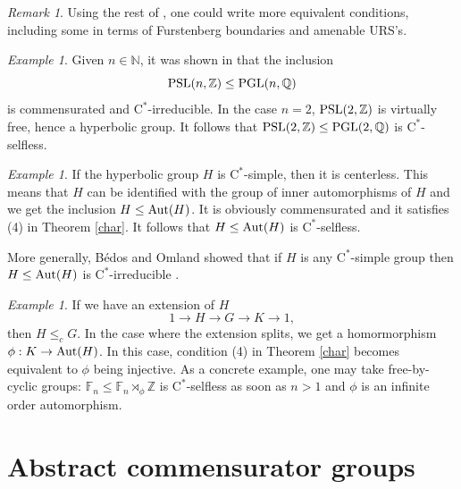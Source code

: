 \documentclass[11pt]{article}
\theoremstyle{definition}
\theoremstyle{remark}
\newtheorem{rem}[thm]{Remark}
\newtheorem{ex}[thm]{Example}
\numberwithin{equation}{section}
\numberwithin{equation}{section}
\newcommand{\Q}{\mathbb{Q}}
\def\N{\mathbb{N}}
\def\Z{\mathbb{Z}}
\def\Z{\mathbb Z}
\newcommand{\Cs}{\ensuremath{\mathrm{C}^\ast}}
\numberwithin{equation}{section}
\begin{document}
\begin{rem}
Using the rest of \cite[Theorem 3.5]{LiSc23}, one could write more equivalent conditions, including some in terms of Furstenberg boundaries and amenable URS's.
\end{rem}




\begin{ex}
    Given $n\in\N$, it was shown in \cite[Corollary 3.7]{LiSc23} that the inclusion $${\rm PSL}(n,\Z)\leq{\rm PGL}(n,\Q)$$ is commensurated and \Cs-irreducible. In the case $n=2$, ${\rm PSL}(2,\Z)$ is virtually free, hence a hyperbolic group. It follows that ${\rm PSL}(2,\Z)\leq{\rm PGL}(2,\Q)$ is \Cs-selfless.
\end{ex}

\begin{ex}
    If the hyperbolic group $H$ is \Cs-simple, then it is centerless. This means that $H$ can be identified with the group of inner automorphisms of $H$ and we get the inclusion $H\leq{\rm Aut}(H)$. It is obviously commensurated and it satisfies (4) in Theorem \ref{char}. It follows that $H\leq{\rm Aut}(H)$ is \Cs-selfless. 
    
    More generally, Bédos and Omland showed that if $H$ is any \Cs-simple group then $H\leq{\rm Aut}(H)$ is \Cs-irreducible \cite[Corollary 6.6]{BeOm23}.
\end{ex}

\begin{ex}
    If we have an extension of $H$
    $$
    1\longrightarrow H\longrightarrow G\longrightarrow K\longrightarrow 1,
    $$
    then $H\leq_cG$. In the case where the extension splits, we get a homormorphism $\phi:K\to {\rm Aut}(H)$. In this case, condition (4) in Theorem \ref{char} becomes equivalent to $\phi$ being injective. As a concrete example, one may take free-by-cyclic groups: $\mathbb F_n\leq\mathbb F_n\rtimes_\phi \Z$ is \Cs-selfless as soon as $n>1$ and $\phi$ is an infinite order automorphism.
\end{ex}




\section{Abstract commensurator groups}\label{comm}

\end{document}
